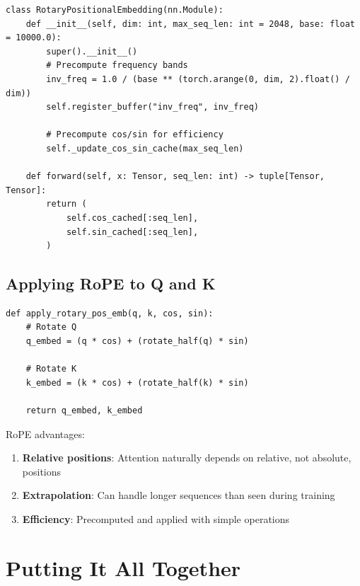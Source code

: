 \begin{lstlisting}[style=python, caption={RoPE from model.py}]
class RotaryPositionalEmbedding(nn.Module):
    def __init__(self, dim: int, max_seq_len: int = 2048, base: float = 10000.0):
        super().__init__()
        # Precompute frequency bands
        inv_freq = 1.0 / (base ** (torch.arange(0, dim, 2).float() / dim))
        self.register_buffer("inv_freq", inv_freq)

        # Precompute cos/sin for efficiency
        self._update_cos_sin_cache(max_seq_len)

    def forward(self, x: Tensor, seq_len: int) -> tuple[Tensor, Tensor]:
        return (
            self.cos_cached[:seq_len],
            self.sin_cached[:seq_len],
        )
\end{lstlisting}

\subsection{Applying RoPE to Q and K}

\begin{lstlisting}[style=python]
def apply_rotary_pos_emb(q, k, cos, sin):
    # Rotate Q
    q_embed = (q * cos) + (rotate_half(q) * sin)

    # Rotate K
    k_embed = (k * cos) + (rotate_half(k) * sin)

    return q_embed, k_embed
\end{lstlisting}

\begin{keypoint}
RoPE advantages:
\begin{enumerate}
    \item \textbf{Relative positions}: Attention naturally depends on relative, not absolute, positions
    \item \textbf{Extrapolation}: Can handle longer sequences than seen during training
    \item \textbf{Efficiency}: Precomputed and applied with simple operations
\end{enumerate}
\end{keypoint}

\section{Putting It All Together}

